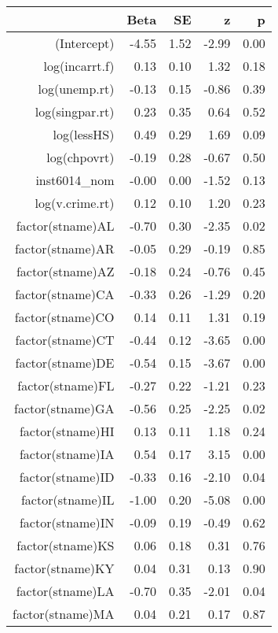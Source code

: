 \begin{table}[ht]
\centering
\begin{tabular}{rrrrr}
  \hline
 & Beta & SE & z & p \\ 
  \hline
(Intercept) & -4.55 & 1.52 & -2.99 & 0.00 \\ 
  log(incarrt.f) & 0.13 & 0.10 & 1.32 & 0.18 \\ 
  log(unemp.rt) & -0.13 & 0.15 & -0.86 & 0.39 \\ 
  log(singpar.rt) & 0.23 & 0.35 & 0.64 & 0.52 \\ 
  log(lessHS) & 0.49 & 0.29 & 1.69 & 0.09 \\ 
  log(chpovrt) & -0.19 & 0.28 & -0.67 & 0.50 \\ 
  inst6014\_nom & -0.00 & 0.00 & -1.52 & 0.13 \\ 
  log(v.crime.rt) & 0.12 & 0.10 & 1.20 & 0.23 \\ 
  factor(stname)AL & -0.70 & 0.30 & -2.35 & 0.02 \\ 
  factor(stname)AR & -0.05 & 0.29 & -0.19 & 0.85 \\ 
  factor(stname)AZ & -0.18 & 0.24 & -0.76 & 0.45 \\ 
  factor(stname)CA & -0.33 & 0.26 & -1.29 & 0.20 \\ 
  factor(stname)CO & 0.14 & 0.11 & 1.31 & 0.19 \\ 
  factor(stname)CT & -0.44 & 0.12 & -3.65 & 0.00 \\ 
  factor(stname)DE & -0.54 & 0.15 & -3.67 & 0.00 \\ 
  factor(stname)FL & -0.27 & 0.22 & -1.21 & 0.23 \\ 
  factor(stname)GA & -0.56 & 0.25 & -2.25 & 0.02 \\ 
  factor(stname)HI & 0.13 & 0.11 & 1.18 & 0.24 \\ 
  factor(stname)IA & 0.54 & 0.17 & 3.15 & 0.00 \\ 
  factor(stname)ID & -0.33 & 0.16 & -2.10 & 0.04 \\ 
  factor(stname)IL & -1.00 & 0.20 & -5.08 & 0.00 \\ 
  factor(stname)IN & -0.09 & 0.19 & -0.49 & 0.62 \\ 
  factor(stname)KS & 0.06 & 0.18 & 0.31 & 0.76 \\ 
  factor(stname)KY & 0.04 & 0.31 & 0.13 & 0.90 \\ 
  factor(stname)LA & -0.70 & 0.35 & -2.01 & 0.04 \\ 
  factor(stname)MA & 0.04 & 0.21 & 0.17 & 0.87 \\ 

\end{tabular}
\end{table}
